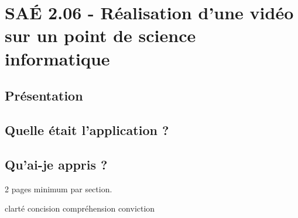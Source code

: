 \documentclass{mytex}
\begin{document}
\section{SAÉ 2.06 - Réalisation d'une vidéo sur un point de science informatique}

\subsection{Présentation}

\subsection{Quelle était l'application ?}

\subsection{Qu'ai-je appris ?}

2 pages minimum par section.

clarté 
concision
compréhension
conviction
\end{document}
